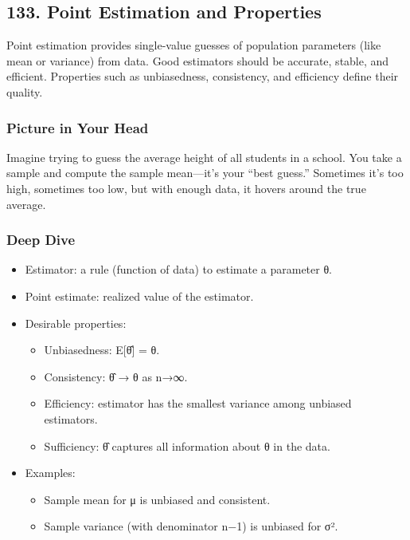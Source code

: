 \documentclass[
  letterpaper,
  DIV=11,
  numbers=noendperiod]{scrreprt}
\providecommand{\tightlist}{%
  \setlength{\itemsep}{0pt}\setlength{\parskip}{0pt}}
\begin{document}
\subsection{133. Point Estimation and
Properties}\label{point-estimation-and-properties}

Point estimation provides single-value guesses of population parameters
(like mean or variance) from data. Good estimators should be accurate,
stable, and efficient. Properties such as unbiasedness, consistency, and
efficiency define their quality.

\subsubsection{Picture in Your Head}\label{picture-in-your-head-132}

Imagine trying to guess the average height of all students in a school.
You take a sample and compute the sample mean---it's your ``best
guess.'' Sometimes it's too high, sometimes too low, but with enough
data, it hovers around the true average.

\subsubsection{Deep Dive}\label{deep-dive-132}

\begin{itemize}
\item
  Estimator: a rule (function of data) to estimate a parameter θ.
\item
  Point estimate: realized value of the estimator.
\item
  Desirable properties:

  \begin{itemize}
  \tightlist
  \item
    Unbiasedness: E{[}θ̂{]} = θ.
  \item
    Consistency: θ̂ → θ as n→∞.
  \item
    Efficiency: estimator has the smallest variance among unbiased
    estimators.
  \item
    Sufficiency: θ̂ captures all information about θ in the data.
  \end{itemize}
\item
  Examples:

  \begin{itemize}
  \tightlist
  \item
    Sample mean for μ is unbiased and consistent.
  \item
    Sample variance (with denominator n−1) is unbiased for σ².
  \end{itemize}
\end{itemize}
\end{document}
